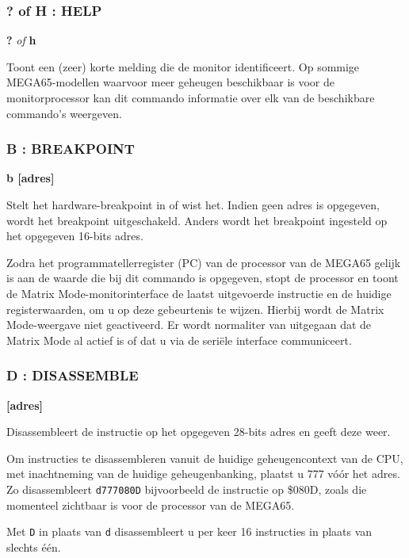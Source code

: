 \subsubsection{? of H : HELP}
\begin{description}[leftmargin=2cm,style=nextline]
\item [Formaat:] {\bf ?} {\em of} {\bf h}\item [Gebruik:] Toont een (zeer) korte melding die de monitor identificeert. Op sommige MEGA65-modellen waarvoor meer geheugen beschikbaar is voor de monitorprocessor kan dit commando informatie over elk van de beschikbare commando's weergeven.

\end{description}


\subsubsection{B : BREAKPOINT}
\begin{description}[leftmargin=2cm,style=nextline]
\item [Formaat:] {\bf b [adres]}\item [Gebruik:] Stelt het hardware-breakpoint in of wist het. Indien geen adres is opgegeven, wordt het breakpoint uitgeschakeld. Anders wordt het breakpoint ingesteld op het opgegeven 16-bits adres.

  Zodra het programmatellerregister (PC) van de processor van de MEGA65 gelijk is aan de waarde die bij dit commando is opgegeven, stopt de processor en toont de Matrix Mode-monitorinterface de laatst uitgevoerde instructie en de huidige registerwaarden, om u op deze gebeurtenis te wijzen. Hierbij wordt de Matrix Mode-weergave niet geactiveerd. Er wordt normaliter van uitgegaan dat de Matrix Mode al actief is of dat u via de seriële interface communiceert.

\end{description}


\subsubsection{D : DISASSEMBLE}
\begin{description}[leftmargin=2cm,style=nextline]
\item [Formaat:] {\bf <d|D> [adres]}\item [Gebruik:] Disassembleert de instructie op het opgegeven 28-bits adres en geeft deze weer.

  Om instructies te disassembleren vanuit de huidige geheugencontext van de CPU, met inachtneming van de huidige geheugenbanking, plaatst u 777 vóór het adres. Zo disassembleert {\tt d777080D} bijvoorbeeld de instructie op \$080D, zoals die momenteel zichtbaar is voor de processor van de MEGA65.

  Met {\tt D} in plaats van {\tt d} disassembleert u per keer 16 instructies in plaats van slechts één.

\end{description}

